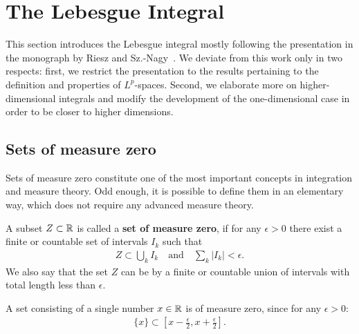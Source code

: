 
\section{The Lebesgue Integral}
\label{sec:lebesgue-integral}
\begin{intro}
  This section introduces the Lebesgue integral mostly following the
  presentation in the monograph by Riesz and
  Sz.-Nagy~\cite{RieszNagy}. We deviate from this work only in two
  respects: first, we restrict the presentation to the results
  pertaining to the definition and properties of $L^p$-spaces. Second,
  we elaborate more on higher-dimensional integrals and modify the
  development of the one-dimensional case in order to be closer to
  higher dimensions.
\end{intro}

\subsection{Sets of measure zero}

\begin{intro}
  Sets of measure zero constitute one of the most important concepts
  in integration and measure theory. Odd enough, it is possible to
  define them in an elementary way, which does not require any
  advanced measure theory.
\end{intro}

\begin{definition}
  A subset $Z\subset \mathbb R$ is called a \textbf{set of measure zero}, if
  for any $\epsilon > 0$ there exist a finite or countable set of
  intervals $I_{k}$ such that
  \begin{gather*}
    Z \subset \bigcup_k I_{k}
    \quad\text{and}\quad
    \sum_k |I_{k}| < \epsilon.
  \end{gather*}
  We also say that the set $Z$ can be  by a finite or
  countable union of intervals with total length less than $\epsilon$.
\end{definition}

\begin{example}
  A set consisting of a single number $x\in\mathbb R$ is of measure zero,
  since for any $\epsilon>0$:
  \begin{gather*}
    \{x\} \subset \left[x-\tfrac\epsilon2,x+\tfrac\epsilon2\right].  
  \end{gather*}
\end{example}

